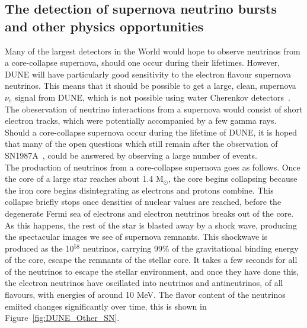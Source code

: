 \subsection{The detection of supernova neutrino bursts and other physics opportunities} \label{sec:DUNE_Other}%
Many of the largest detectors in the World would hope to observe neutrinos from a core-collapse supernova, should one occur during their lifetimes. However, DUNE will have particularly good sensitivity to the electron flavour supernova neutrinos. This means that it should be possible to get a large, clean, supernova $\nu_e$ signal from DUNE, which is not possible using water Cherenkov detectors~\citep{KScholSND, Laha:2013hva}. The obeservation of neutrino interactions from a supernova would consist of short electron tracks, which were potentially accompanied by a few gamma rays. Should a core-collapse supernova occur during the lifetime of DUNE, it is hoped that many of the open questions which still remain after the observation of SN1987A~\citep{PhysRevLett.58.1494, PhysRevLett.58.1490}, could be answered by observing a large number of events. \\

The production of neutrinos from a core-collapse supernova goes as follows. Once the core of a large star reaches about 1.4 M$_{\odot}$, the core begins collapsing because the iron core begins disintegrating as electrons and protons combine. This collapse briefly stops once densities of nuclear values are reached, before the degenerate Fermi sea of electrons and electron neutrinos breaks out of the core. As this happens, the rest of the star is blasted away by a shock wave, producing the spectacular images we see of supernova remnants. This shockwave is produced as the 10$^{58}$ neutrinos, carrying 99\% of the gravitational binding energy of the core, escape the remnants of the stellar core. It takes a few seconds for all of the neutrinos to escape the stellar environment, and once they have done this, the electron neutrinos have oscillated into neutrinos and antineutrinos, of all flavours, with energies of around 10 MeV. The flavor content of the neutrinos emiited changes significantly over time, this is shown in Figure~\ref{fig:DUNE_Other_SN}. \\

